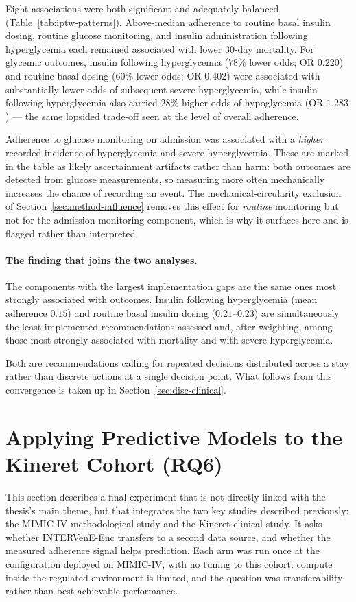 Eight associations were both significant and adequately balanced (Table~\ref{tab:iptw-patterns}). Above-median adherence to routine basal insulin dosing, routine glucose monitoring, and insulin administration following hyperglycemia each remained associated with lower $30$-day mortality. For glycemic outcomes, insulin following hyperglycemia ($78\%$ lower odds; OR $0.220$) and routine basal dosing ($60\%$ lower odds; OR $0.402$) were associated with substantially lower odds of subsequent severe hyperglycemia, while insulin following hyperglycemia also carried $28\%$ higher odds of hypoglycemia (OR $1.283$) --- the same lopsided trade-off seen at the level of overall adherence.

Adherence to glucose monitoring on admission was associated with a \emph{higher} recorded incidence of hyperglycemia and severe hyperglycemia. These are marked in the table as likely ascertainment artifacts rather than harm: both outcomes are detected from glucose measurements, so measuring more often mechanically increases the chance of recording an event. The mechanical-circularity exclusion of Section~\ref{sec:method-influence} removes this effect for \emph{routine} monitoring but not for the admission-monitoring component, which is why it surfaces here and is flagged rather than interpreted.

\paragraph{The finding that joins the two analyses.}
The components with the largest implementation gaps are the same ones most strongly associated with outcomes. Insulin following hyperglycemia (mean adherence $0.15$) and routine basal insulin dosing ($0.21$--$0.23$) are simultaneously the least-implemented recommendations assessed and, after weighting, among those most strongly associated with mortality and with severe hyperglycemia.

Both are recommendations calling for repeated decisions distributed across a stay rather than discrete actions at a single decision point. What follows from this convergence is taken up in Section~\ref{sec:disc-clinical}.

\section{Applying Predictive Models to the Kineret Cohort (RQ6)}
\label{sec:eval-kineret-models}


This section describes a final experiment that is not directly linked with the thesis's main theme, but that integrates the two key studies described previously: the MIMIC-IV methodological study and the Kineret clinical study. It asks whether INTERVenE-Enc transfers to a second data source, and whether the measured adherence signal helps prediction. Each arm was run once at the configuration deployed on MIMIC-IV, with no tuning to this cohort: compute inside the regulated environment is limited, and the question was transferability rather than best achievable performance.

